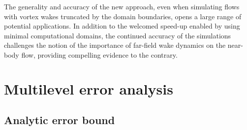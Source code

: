 \documentclass[final,1p,times]{elsarticle}
\begin{document}
The generality and accuracy of the new approach, even when simulating flows with vortex wakes truncated by the domain boundaries, opens a large range of potential applications. In addition to the welcomed speed-up enabled by using minimal computational domains, the continued accuracy of the simulations challenges the notion of the importance of far-field wake dynamics on the near-body flow, providing compelling evidence to the contrary.



\appendix

\section{Multilevel error analysis}\label{A0}

\subsection{Analytic error bound}
\end{document}
